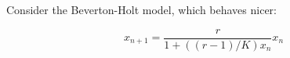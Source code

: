 \documentclass[11pt]{article}
\begin{document}
    \begin{center}
    \end{center}
    { \hspace*{\fill} \\}
    
    \begin{center}
    \end{center}
    { \hspace*{\fill} \\}
    
    \begin{center}
    \end{center}
    { \hspace*{\fill} \\}
    
    \begin{center}
    \end{center}
    { \hspace*{\fill} \\}
    
    \begin{center}
    \end{center}
    { \hspace*{\fill} \\}
    
    Consider the Beverton-Holt model, which behaves nicer:

\[x_{n+1} = \dfrac{r}{1 + ((r-1)/K)x_n}x_n\]
\end{document}

